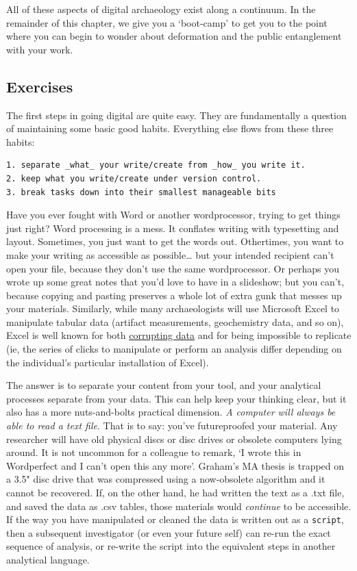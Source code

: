 \documentclass[english,]{book}
\begin{document}
All of these aspects of digital archaeology exist along a continuum. In
the remainder of this chapter, we give you a `boot-camp' to get you to
the point where you can begin to wonder about deformation and the public
entanglement with your work.

\subsection{Exercises}\label{exercises}

The first steps in going digital are quite easy. They are fundamentally
a question of maintaining some basic good habits. Everything else flows
from these three habits:

\begin{verbatim}
1. separate _what_ your write/create from _how_ you write it.
2. keep what you write/create under version control.
3. break tasks down into their smallest manageable bits
\end{verbatim}

Have you ever fought with Word or another wordprocessor, trying to get
things just right? Word processing is a mess. It conflates writing with
typesetting and layout. Sometimes, you just want to get the words out.
Othertimes, you want to make your writing as accessible as
possible\ldots{} but your intended recipient can't open your file,
because they don't use the same wordprocessor. Or perhaps you wrote up
some great notes that you'd love to have in a slideshow; but you can't,
because copying and pasting preserves a whole lot of extra gunk that
messes up your materials. Similarly, while many archaeologists will use
Microsoft Excel to manipulate tabular data (artifact measurements,
geochemistry data, and so on), Excel is well known for both
\href{https://github.com/jennybc/scary-excel-stories}{corrupting data}
and for being impossible to replicate (ie, the series of clicks to
manipulate or perform an analysis differ depending on the individual's
particular installation of Excel).

The answer is to separate your content from your tool, and your
analytical processes separate from your data. This can help keep your
thinking clear, but it also has a more nuts-and-bolts practical
dimension. \emph{A computer will always be able to read a text file}.
That is to say: you've futureproofed your material. Any researcher will
have old physical discs or disc drives or obsolete computers lying
around. It is not uncommon for a colleague to remark, `I wrote this in
Wordperfect and I can't open this any more'. Graham's MA thesis is
trapped on a 3.5" disc drive that was compressed using a now-obsolete
algorithm and it cannot be recovered. If, on the other hand, he had
written the text as a .txt file, and saved the data as .csv tables,
those materials would \emph{continue} to be accessible. If the way you
have manipulated or cleaned the data is written out as a
\texttt{script}, then a subsequent investigator (or even your future
self) can re-run the exact sequence of analysis, or re-write the script
into the equivalent steps in another analytical language.
\end{document}
